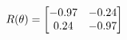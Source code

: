 \documentclass[preview]{standalone}
\begin{document}
\begin{align*}
\special{dvisvgm:raw <g id='unique000'>}R(\theta) = \begin{bmatrix}-0.97 & -0.24\\0.24 & -0.97\end{bmatrix}\special{dvisvgm:raw </g>}
\end{align*}
\end{document}

